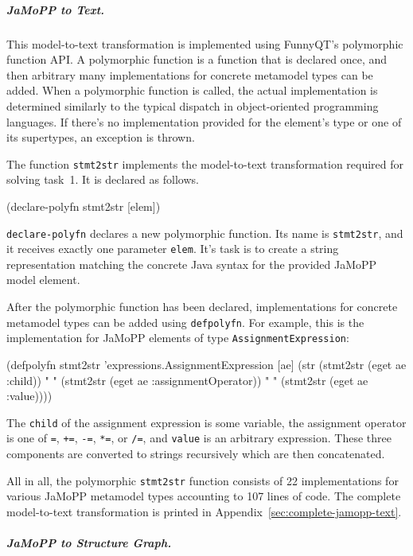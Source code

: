 \documentclass[submission]{eptcs}
\begin{document}
\subparagraph{JaMoPP to Text.}
\label{sec:jamopp-text}

This model-to-text transformation is implemented using FunnyQT's polymorphic
function API.  A polymorphic function is a function that is declared once, and
then arbitrary many implementations for concrete metamodel types can be added.
When a polymorphic function is called, the actual implementation is determined
similarly to the typical dispatch in object-oriented programming languages.  If
there's no implementation provided for the element's type or one of its
supertypes, an exception is thrown.

The function \verb|stmt2str| implements the model-to-text transformation
required for solving task~1.  It is declared as follows.

\begin{clojurecode}
(declare-polyfn stmt2str [elem])
\end{clojurecode}

\verb|declare-polyfn| declares a new polymorphic function.  Its name is
\verb|stmt2str|, and it receives exactly one parameter \verb|elem|.  It's task
is to create a string representation matching the concrete Java syntax for the
provided JaMoPP model element.

After the polymorphic function has been declared, implementations for concrete
metamodel types can be added using \verb|defpolyfn|.  For example, this is the
implementation for JaMoPP elements of type \verb|AssignmentExpression|:

\begin{clojurecode}
(defpolyfn stmt2str 'expressions.AssignmentExpression [ae]
  (str (stmt2str (eget ae :child)) " "
       (stmt2str (eget ae :assignmentOperator)) " "
       (stmt2str (eget ae :value))))
\end{clojurecode}

The \verb|child| of the assignment expression is some variable, the assignment
operator is one of \verb|=|, \verb|+=|, \verb|-=|, \verb|*=|, or \verb|/=|, and
\verb|value| is an arbitrary expression.  These three components are converted
to strings recursively which are then concatenated.

All in all, the polymorphic \verb|stmt2str| function consists of 22
implementations for various JaMoPP metamodel types accounting to 107 lines of
code.  The complete model-to-text transformation is printed in
Appendix~\ref{sec:complete-jamopp-text}.


\subparagraph{JaMoPP to Structure Graph.}
\label{sec:jamopp-struct-graph}
\end{document}
